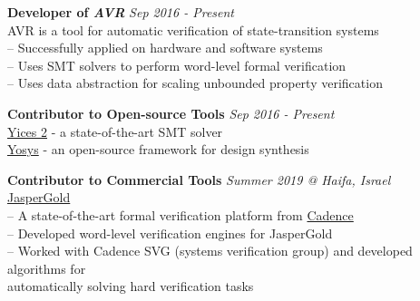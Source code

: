 \documentclass[margin,line,letter]{resume}
\begin{document}
\begin{resume}
    \hspace{-2em} \href{https://github.com/aman-goel/avr}{\faGithub} \hspace{0.3em}
    \textbf{Developer of \textit{AVR}} \hfill \emph{Sep 2016 - Present}\\
    \phantom{xx}\hspace{1ex} AVR is a tool for automatic verification of state-transition systems \\
    \phantom{xx}\hspace{1ex} -- Successfully applied on hardware and software systems \\
    \phantom{xx}\hspace{1ex} -- Uses SMT solvers to perform word-level formal verification \\
    \phantom{xx}\hspace{1ex} -- Uses data abstraction for scaling unbounded property verification
    
    \textbf{Contributor to Open-source Tools} \hfill \emph{Sep 2016 - Present}\\ 
    \phantom{xx}\hspace{1ex} \href{https://github.com/SRI-CSL/yices2}{Yices 2} - a state-of-the-art SMT solver \\
    \phantom{xx}\hspace{1ex} \href{https://github.com/YosysHQ/yosys}{Yosys} - an open-source framework for design synthesis

    \textbf{Contributor to Commercial Tools} \hfill \emph{Summer 2019 @ Haifa, Israel}\\ 
    \phantom{xx}\hspace{1ex} \href{https://www.cadence.com/content/cadence-www/global/en_US/home/tools/system-design-and-verification/formal-and-static-verification/jasper-gold-verification-platform.html}{JasperGold} \\
    \phantom{xx}\hspace{1ex} -- A state-of-the-art formal verification platform from \href{https://www.cadence.com/}{Cadence} \\
    \phantom{xx}\hspace{1ex} -- Developed word-level verification engines for JasperGold \\
    \phantom{xx}\hspace{1ex} -- Worked with Cadence SVG (systems verification group) and developed algorithms for \\
    \phantom{xx}\hspace{3ex} automatically solving hard verification tasks


\end{resume}
\end{document}

